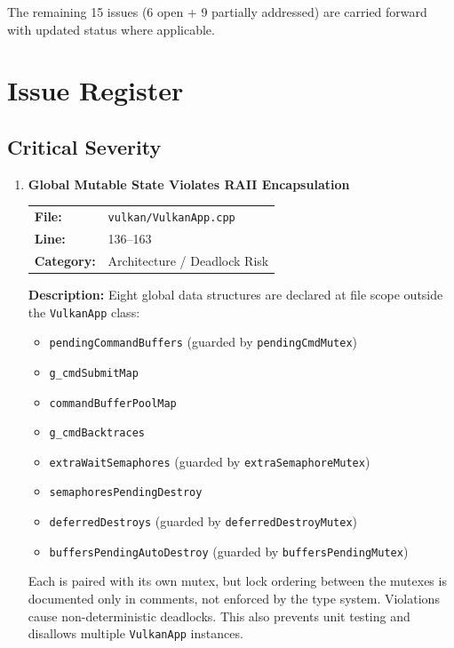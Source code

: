 \documentclass[a4paper,12pt]{article}
\newcommand{\severitybox}[2]{%
  \colorbox{#1}{\makebox[2.5cm][c]{\textcolor{white}{\textbf{#2}}}}%
}
\begin{document}
The remaining 15 issues (6 open + 9 partially addressed) are carried forward
with updated status where applicable.

\newpage

\section{Issue Register}

\subsection{Critical Severity}

\begin{enumerate}[leftmargin=*]

\item[\textbf{[G1]}] \textbf{Global Mutable State Violates RAII Encapsulation}
  \hfill \severitybox{criticalcolor}{CRITICAL}

  \begin{tabular}{ll}
    \textbf{File:} & \texttt{vulkan/VulkanApp.cpp} \\
    \textbf{Line:} & 136--163 \\
    \textbf{Category:} & Architecture / Deadlock Risk \\
  \end{tabular}

  \textbf{Description:}
  Eight global data structures are declared at file scope outside the
  \texttt{VulkanApp} class:

  \begin{itemize}[noitemsep]
    \item \texttt{pendingCommandBuffers} (guarded by \texttt{pendingCmdMutex})
    \item \texttt{g\_cmdSubmitMap}
    \item \texttt{commandBufferPoolMap}
    \item \texttt{g\_cmdBacktraces}
    \item \texttt{extraWaitSemaphores} (guarded by \texttt{extraSemaphoreMutex})
    \item \texttt{semaphoresPendingDestroy}
    \item \texttt{deferredDestroys} (guarded by \texttt{deferredDestroyMutex})
    \item \texttt{buffersPendingAutoDestroy} (guarded by \texttt{buffersPendingMutex})
  \end{itemize}

  Each is paired with its own mutex, but lock ordering between the mutexes is
  documented only in comments, not enforced by the type system. Violations
  cause non-deterministic deadlocks. This also prevents unit testing and
  disallows multiple \texttt{VulkanApp} instances.


\end{enumerate}
\end{document}
